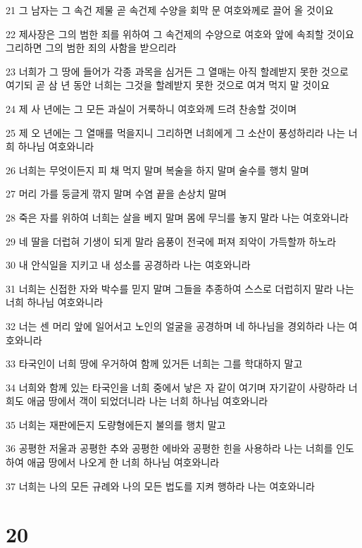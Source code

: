 \par 21 그 남자는 그 속건 제물 곧 속건제 수양을 회막 문 여호와께로 끌어 올 것이요
\par 22 제사장은 그의 범한 죄를 위하여 그 속건제의 수양으로 여호와 앞에 속죄할 것이요 그리하면 그의 범한 죄의 사함을 받으리라
\par 23 너희가 그 땅에 들어가 각종 과목을 심거든 그 열매는 아직 할례받지 못한 것으로 여기되 곧 삼 년 동안 너희는 그것을 할례받지 못한 것으로 여겨 먹지 말 것이요
\par 24 제 사 년에는 그 모든 과실이 거룩하니 여호와께 드려 찬송할 것이며
\par 25 제 오 년에는 그 열매를 먹을지니 그리하면 너희에게 그 소산이 풍성하리라 나는 너희 하나님 여호와니라
\par 26 너희는 무엇이든지 피 채 먹지 말며 복술을 하지 말며 술수를 행치 말며
\par 27 머리 가를 둥글게 깎지 말며 수염 끝을 손상치 말며
\par 28 죽은 자를 위하여 너희는 살을 베지 말며 몸에 무늬를 놓지 말라 나는 여호와니라
\par 29 네 딸을 더럽혀 기생이 되게 말라 음풍이 전국에 퍼져 죄악이 가득할까 하노라
\par 30 내 안식일을 지키고 내 성소를 공경하라 나는 여호와니라
\par 31 너희는 신접한 자와 박수를 믿지 말며 그들을 추종하여 스스로 더럽히지 말라 나는 너희 하나님 여호와니라
\par 32 너는 센 머리 앞에 일어서고 노인의 얼굴을 공경하며 네 하나님을 경외하라 나는 여호와니라
\par 33 타국인이 너희 땅에 우거하여 함께 있거든 너희는 그를 학대하지 말고
\par 34 너희와 함께 있는 타국인을 너희 중에서 낳은 자 같이 여기며 자기같이 사랑하라 너희도 애굽 땅에서 객이 되었더니라 나는 너희 하나님 여호와니라
\par 35 너희는 재판에든지 도량형에든지 불의를 행치 말고
\par 36 공평한 저울과 공평한 추와 공평한 에바와 공평한 힌을 사용하라 나는 너희를 인도하여 애굽 땅에서 나오게 한 너희 하나님 여호와니라
\par 37 너희는 나의 모든 규례와 나의 모든 법도를 지켜 행하라 나는 여호와니라

\chapter{20}

